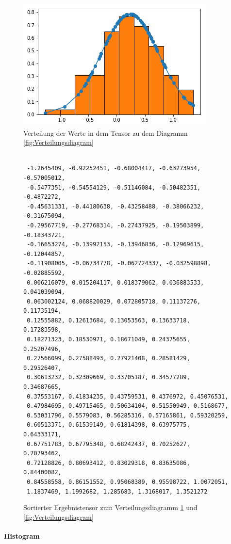 \begin{figure}
	\centering
	\includegraphics[scale=0.6]{images/gaussian.png}
	\caption{Verteilung der Werte in dem Tensor zu dem Diagramm \ref{fig:Verteilungsdiagram}}
	\label{fig:VerteilungsdiagrammPython}
\end{figure}

\begin{figure}

\lstset{language=Python}
\begin{lstlisting}

 -1.2645409, -0.92252451, -0.68004417, -0.63273954, -0.57005012, 
 -0.5477351, -0.54554129, -0.51146084, -0.50482351, -0.4872272, 
 -0.45631331, -0.44180638, -0.43258488, -0.38066232, -0.31675094, 
 -0.29567719, -0.27768314, -0.27437925, -0.19503899, -0.18343721, 
 -0.16653274, -0.13992153, -0.13946836, -0.12969615, -0.12044857, 
 -0.11908005, -0.06734778, -0.062724337, -0.032598898, -0.02885592, 
 0.006216079, 0.015204117, 0.018379062, 0.036883533, 0.041039094, 
 0.063002124, 0.068820029, 0.072805718, 0.11137276, 0.11735194, 
 0.12555882, 0.12613684, 0.13053563, 0.13633718, 0.17283598, 
 0.18271323, 0.18530971, 0.18671049, 0.24375655, 0.25207496, 
 0.27566099, 0.27588493, 0.27921408, 0.28581429, 0.29526407, 
 0.30613232, 0.32309669, 0.33705187, 0.34577289, 0.34687665, 
 0.37553167, 0.41834235, 0.43759531, 0.4376972, 0.45076531, 
 0.47984695, 0.49715465, 0.50634104, 0.51550949, 0.5168677, 
 0.53031796, 0.5579083, 0.56285316, 0.57165861, 0.59320259, 
 0.60513371, 0.61539149, 0.61814398, 0.63975775, 0.64333171, 
 0.67751783, 0.67795348, 0.68242437, 0.70252627, 0.70793462, 
 0.72128826, 0.80693412, 0.83029318, 0.83635086, 0.84400082, 
 0.84558558, 0.86151552, 0.95068389, 0.95598722, 1.0072051, 
 1.1837469, 1.1992682, 1.285683, 1.3168017, 1.3521272

\end{lstlisting}

	\caption{Sortierter Ergebnistensor zum Verteilungsdiagramm \ref{fig:VerteilungsdiagrammPython} und \ref{fig:Verteilungsdiagram}}
	\label{fig:Ergebnistensor}
\end{figure}




\paragraph{Histogram} 















